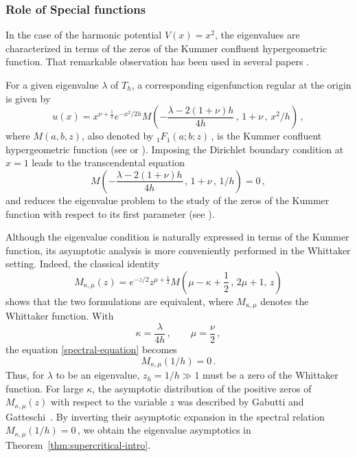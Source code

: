 \documentclass[11pt]{amsart}
\numberwithin{equation}{section}
\theoremstyle{remark}
\begin{document}
\subsubsection{Role of Special functions}
%
%
In the case of the harmonic potential $V(x)=x^2$, 
%
%
the eigenvalues are characterized in terms of the zeros of  the Kummer confluent hypergeometric function. That remarkable observation has been used in several papers \cite{BaurWeidl, Vanlaere}. 


For a given eigenvalue $\lambda$ of $T_h$, a corresponding eigenfunction regular at the origin is given by
\begin{equation}\label{regular-solution}
u(x)
=
x^{\nu+\frac12}
e^{-x^2/2h}
M\!\left(
-\frac{\lambda-2(1+\nu)h}{4h}\,,
\,1+\nu\,,\,
x^2/h
\right)\,,
\end{equation}
where \(M(a,b,z)\), also denoted by \({}_1F_1(a;b;z)\)\,, is the Kummer
confluent hypergeometric function (see
\cite[pp.~262--264]{MOS1966} or
\cite[\S13.2, Eq.~13.2.4 and \S13.3]{DLMF}).
Imposing the Dirichlet boundary condition at \(x=1\) leads to the transcendental equation 
\begin{equation}\label{spectral-equation}
M\!\left(
-\frac{\lambda-2(1+\nu)h}{4h}\,,
\,1+\nu\,,\,
1/h
\right)
=0\,,
\end{equation}
and reduces the eigenvalue problem to the study of the zeros of the Kummer function with respect
to its first parameter (see \cite[Theorem~1.2]{Vanlaere}).

Although the eigenvalue condition is naturally expressed in terms of
the Kummer function, its asymptotic analysis is more conveniently
performed in the Whittaker setting. Indeed, the classical identity
\cite[\S13.14, Eq.~13.14.2]{DLMF}
\begin{equation}\label{Kummer-Whittaker}
M_{\kappa,\mu}(z)
=
e^{-z/2}z^{\mu+\frac12}
M\!\left(\mu-\kappa+\frac12\,,\,2\mu+1,\,z\right)
\end{equation}
shows that the two formulations are equivalent, where
\(M_{\kappa,\mu}\) denotes the Whittaker function. With
\begin{equation}\label{kappa-mu}
\kappa
=
\frac{\lambda}{4h}\,,
\qquad
\mu=\frac{\nu}{2}\,,
\end{equation}
the equation
\eqref{spectral-equation} becomes
\begin{equation}\label{Whittaker-spectral}
M_{\kappa,\mu}(1/h)=0\,.
\end{equation}
% 
Thus, for $\lambda$ to be an eigenvalue, $z_h=1/h\gg1$ must be a zero of the Whittaker function.  For large $\kappa$, the asymptotic distribution of the positive zeros
of $M_{\kappa,\mu}(z)$ with respect to the variable $z$ was described
by Gabutti and Gatteschi~\cite{GG2001}.
By inverting their asymptotic expansion in the spectral relation
$M_{\kappa,\mu}(1/h)=0$\,, we obtain the eigenvalue asymptotics in Theorem~\ref{thm:supercritical-intro}.
%
%
\end{document}
